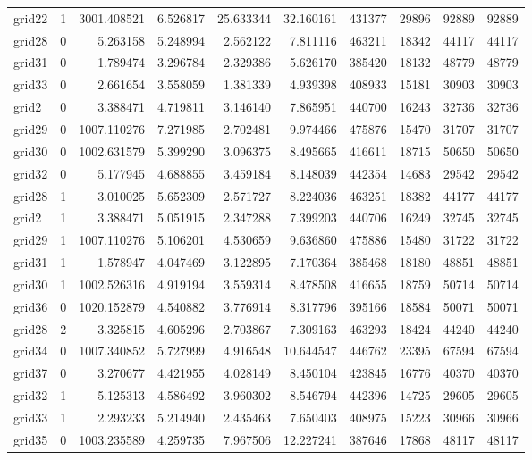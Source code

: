 \begin{longtable}{|l|r|r|r|r|r|r|r|r|r|}
grid22 & 1 & 3001.408521 & 6.526817 & 25.633344 & 32.160161 & 431377 & 29896 & 92889 & 92889 \\
grid28 & 0 & 5.263158 & 5.248994 & 2.562122 & 7.811116 & 463211 & 18342 & 44117 & 44117 \\
grid31 & 0 & 1.789474 & 3.296784 & 2.329386 & 5.626170 & 385420 & 18132 & 48779 & 48779 \\
grid33 & 0 & 2.661654 & 3.558059 & 1.381339 & 4.939398 & 408933 & 15181 & 30903 & 30903 \\
grid2 & 0 & 3.388471 & 4.719811 & 3.146140 & 7.865951 & 440700 & 16243 & 32736 & 32736 \\
grid29 & 0 & 1007.110276 & 7.271985 & 2.702481 & 9.974466 & 475876 & 15470 & 31707 & 31707 \\
grid30 & 0 & 1002.631579 & 5.399290 & 3.096375 & 8.495665 & 416611 & 18715 & 50650 & 50650 \\
grid32 & 0 & 5.177945 & 4.688855 & 3.459184 & 8.148039 & 442354 & 14683 & 29542 & 29542 \\
grid28 & 1 & 3.010025 & 5.652309 & 2.571727 & 8.224036 & 463251 & 18382 & 44177 & 44177 \\
grid2 & 1 & 3.388471 & 5.051915 & 2.347288 & 7.399203 & 440706 & 16249 & 32745 & 32745 \\
grid29 & 1 & 1007.110276 & 5.106201 & 4.530659 & 9.636860 & 475886 & 15480 & 31722 & 31722 \\
grid31 & 1 & 1.578947 & 4.047469 & 3.122895 & 7.170364 & 385468 & 18180 & 48851 & 48851 \\
grid30 & 1 & 1002.526316 & 4.919194 & 3.559314 & 8.478508 & 416655 & 18759 & 50714 & 50714 \\
grid36 & 0 & 1020.152879 & 4.540882 & 3.776914 & 8.317796 & 395166 & 18584 & 50071 & 50071 \\
grid28 & 2 & 3.325815 & 4.605296 & 2.703867 & 7.309163 & 463293 & 18424 & 44240 & 44240 \\
grid34 & 0 & 1007.340852 & 5.727999 & 4.916548 & 10.644547 & 446762 & 23395 & 67594 & 67594 \\
grid37 & 0 & 3.270677 & 4.421955 & 4.028149 & 8.450104 & 423845 & 16776 & 40370 & 40370 \\
grid32 & 1 & 5.125313 & 4.586492 & 3.960302 & 8.546794 & 442396 & 14725 & 29605 & 29605 \\
grid33 & 1 & 2.293233 & 5.214940 & 2.435463 & 7.650403 & 408975 & 15223 & 30966 & 30966 \\
grid35 & 0 & 1003.235589 & 4.259735 & 7.967506 & 12.227241 & 387646 & 17868 & 48117 & 48117 \\

\end{longtable}

